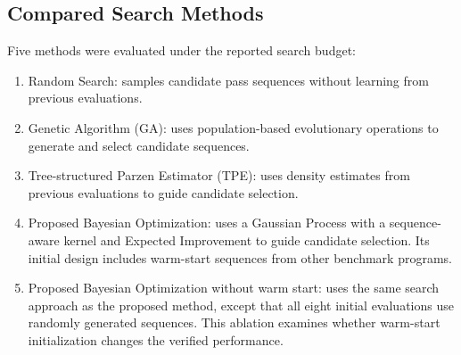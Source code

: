 \subsection{Compared Search Methods}
Five methods were evaluated under the reported search budget:
\begin{enumerate}[leftmargin=*,itemsep=1pt,label=\arabic*)]
\item Random Search: samples candidate pass sequences without learning from previous evaluations.
\item Genetic Algorithm (GA): uses population-based evolutionary operations to generate and select candidate sequences.
\item Tree-structured Parzen Estimator (TPE): uses density estimates from previous evaluations to guide candidate selection.
\item Proposed Bayesian Optimization: uses a Gaussian Process with a sequence-aware kernel and Expected Improvement to guide candidate selection. Its initial design includes warm-start sequences from other benchmark programs.
\item Proposed Bayesian Optimization without warm start: uses the same search approach as the proposed method, except that all eight initial evaluations use randomly generated sequences. This ablation examines whether warm-start initialization changes the verified performance.
\end{enumerate}

